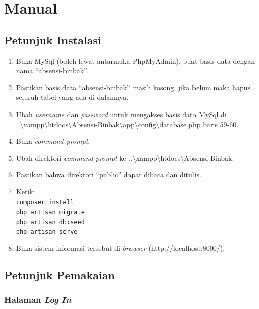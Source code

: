 \section{Manual}

\subsection{Petunjuk Instalasi}
\begin{enumerate}
	\item Buka MySql (boleh lewat antarmuka PhpMyAdmin), buat basis data dengan nama ``absensi-binbak''.
	\item Pastikan basis data ``absensi-binbak'' masih kosong, jika belum maka hapus seluruh tabel yang ada di dalamnya.
	\item Ubah \textit{username} dan \textit{password} untuk mengakses basis data MySql di ..\textbackslash xampp\textbackslash htdocs\textbackslash Absensi-Binbak\textbackslash app\textbackslash config\textbackslash database.php baris 59-60.
	\item Buka \textit{command prompt}.
	\item Ubah direktori \textit{command prompt} ke ..\textbackslash xampp\textbackslash htdocs\textbackslash Absensi-Binbak.
	\item Pastikan bahwa direktori ``public'' dapat dibaca dan ditulis.
	\item Ketik: \\\texttt{composer install}\\\texttt{php artisan migrate}\\\texttt{php artisan db:seed}\\\texttt{php artisan serve}
	\item Buka sistem informasi tersebut di \textit{browser} (http://localhost:8000/).
\end{enumerate}

\subsection{Petunjuk Pemakaian}


\subsubsection{Halaman \textit{Log In}}
\label{sec:page1}

